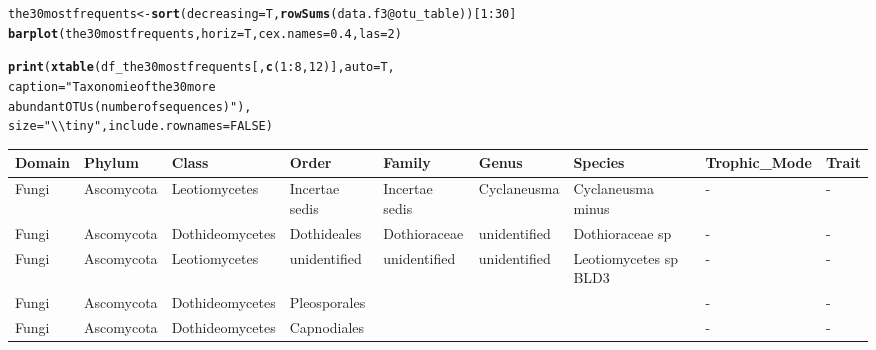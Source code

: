 \documentclass[12pt]{article}\usepackage[]{graphicx}\usepackage[]{color}
\makeatletter
\newcommand{\hlnum}[1]{\textcolor[rgb]{0.686,0.059,0.569}{#1}}%
\newcommand{\hlstr}[1]{\textcolor[rgb]{0.192,0.494,0.8}{#1}}%
\newcommand{\hlopt}[1]{\textcolor[rgb]{0,0,0}{#1}}%
\newcommand{\hlstd}[1]{\textcolor[rgb]{0.345,0.345,0.345}{#1}}%
\newcommand{\hlkwb}[1]{\textcolor[rgb]{0.69,0.353,0.396}{#1}}%
\newcommand{\hlkwc}[1]{\textcolor[rgb]{0.333,0.667,0.333}{#1}}%
\newcommand{\hlkwd}[1]{\textcolor[rgb]{0.737,0.353,0.396}{\textbf{#1}}}%
\newenvironment{kframe}{%
 \def\at@end@of@kframe{}%
 \ifinner\ifhmode%
  \def\at@end@of@kframe{\end{minipage}}%
  \begin{minipage}{\columnwidth}%
 \fi\fi%
 \def\FrameCommand##1{\hskip\@totalleftmargin \hskip-\fboxsep
 \colorbox{shadecolor}{##1}\hskip-\fboxsep
     \hskip-\linewidth \hskip-\@totalleftmargin \hskip\columnwidth}%
 \MakeFramed {\advance\hsize-\width
   \@totalleftmargin\z@ \linewidth\hsize
   \@setminipage}}%
 {\par\unskip\endMakeFramed%
 \at@end@of@kframe}
\newenvironment{knitrout}{}{} %
\numberwithin{figure}{section}
\makeatother
\begin{document}
\begin{knitrout}\small
{}\color{fgcolor}\begin{kframe}
\begin{alltt}
\hlstd{the30mostfrequents} \hlkwb{<-} \hlkwd{sort}\hlstd{(}\hlkwc{decreasing} \hlstd{= T,} \hlkwd{rowSums}\hlstd{(data.f3}\hlopt{@}\hlkwc{otu_table}\hlstd{))[}\hlnum{1}\hlopt{:}\hlnum{30}\hlstd{]}
\hlkwd{barplot}\hlstd{(the30mostfrequents,} \hlkwc{horiz} \hlstd{= T,} \hlkwc{cex.names} \hlstd{=} \hlnum{0.4}\hlstd{,} \hlkwc{las} \hlstd{=} \hlnum{2}\hlstd{)}
\end{alltt}
\end{kframe}
\end{knitrout}



\begin{landscape}
\begin{kframe}
\begin{alltt}
\hlkwd{print}\hlstd{(}\hlkwd{xtable}\hlstd{(df_the30mostfrequents[,} \hlkwd{c}\hlstd{(}\hlnum{1}\hlopt{:}\hlnum{8}\hlstd{,} \hlnum{12}\hlstd{)],} \hlkwc{auto} \hlstd{= T,}
             \hlkwc{caption} \hlstd{=} \hlstr{"Taxonomie of the 30 more
             abundant OTUs (number of sequences)"}\hlstd{),}
      \hlkwc{size} \hlstd{=} \hlstr{"\textbackslash{}\textbackslash{}tiny"}\hlstd{,} \hlkwc{include.rownames} \hlstd{=} \hlnum{FALSE}\hlstd{)}
\end{alltt}
\end{kframe}%
\begin{table}[ht]
\centering
\begingroup\tiny
\begin{tabular}{lllllllll}
  \hline
Domain & Phylum & Class & Order & Family & Genus & Species & Trophic\_Mode & Trait \\ 
  \hline
Fungi & Ascomycota & Leotiomycetes & Incertae sedis & Incertae sedis & Cyclaneusma & Cyclaneusma minus & - & - \\ 
  Fungi & Ascomycota & Dothideomycetes & Dothideales & Dothioraceae & unidentified & Dothioraceae sp & - & - \\ 
  Fungi & Ascomycota & Leotiomycetes & unidentified & unidentified & unidentified & Leotiomycetes sp BLD3 & - & - \\ 
  Fungi & Ascomycota & Dothideomycetes & Pleosporales &  &  &  & - & - \\ 
  Fungi & Ascomycota & Dothideomycetes & Capnodiales &  &  &  & - & - \\ 

\end{tabular}
\end{table}
\end{landscape}
\end{document}
